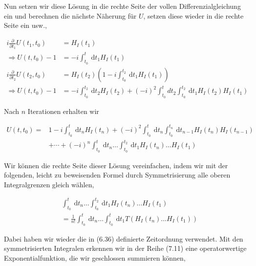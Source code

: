 \documentclass[10pt, letterpaper]{article}
\begin{document}
Nun setzen wir diese Lösung in die rechte Seite der vollen Differenzialgleichung ein und berechnen die nächste Näherung für $U$, setzen diese wieder in die rechte Seite ein usw.,

$$
\begin{aligned}
i \frac{\partial}{\partial t_{1}} U\left(t_{1}, t_{0}\right) & =H_{I}\left(t_{1}\right) \\
\Rightarrow U\left(t, t_{0}\right)-1 & =-i \int_{t_{0}}^{t} \mathrm{~d} t_{1} H_{I}\left(t_{1}\right) \\
i \frac{\partial}{\partial t_{2}} U\left(t_{2}, t_{0}\right) & =H_{I}\left(t_{2}\right)\left(1-i \int_{t_{0}}^{t_{2}} \mathrm{~d} t_{1} H_{I}\left(t_{1}\right)\right) \\
\Rightarrow U\left(t, t_{0}\right)-1 & =-i \int_{t_{0}}^{t_{2}} \mathrm{~d} t_{2} H_{I}\left(t_{2}\right)+(-i)^{2} \int_{t_{0}}^{t} d t_{2} \int_{t_{0}}^{t_{2}} \mathrm{~d} t_{1} H_{I}\left(t_{2}\right) H_{I}\left(t_{1}\right)
\end{aligned}
$$

Nach $n$ Iterationen erhalten wir

$$
\begin{aligned}
U\left(t, t_{0}\right)= & 1-i \int_{t_{0}}^{t} \mathrm{~d} t_{n} H_{I}\left(t_{n}\right)+(-i)^{2} \int_{t_{0}}^{t} \mathrm{~d} t_{n} \int_{t_{0}}^{t_{n}} \mathrm{~d} t_{n-1} H_{I}\left(t_{n}\right) H_{I}\left(t_{n-1}\right) \\
& +\cdots+(-i)^{n} \int_{t_{0}}^{t} \mathrm{~d} t_{n} \ldots \int_{t_{0}}^{t_{2}} \mathrm{~d} t_{1} H_{I}\left(t_{n}\right) \ldots H_{I}\left(t_{1}\right)
\end{aligned}
$$

Wir können die rechte Seite dieser Lösung vereinfachen, indem wir mit der folgenden, leicht zu beweisenden Formel durch Symmetrisierung alle oberen Integralgrenzen gleich wählen,

$$
\begin{aligned}
& \int_{t_{0}}^{t} \mathrm{~d} t_{n} \ldots \int_{t_{0}}^{t_{2}} \mathrm{~d} t_{1} H_{I}\left(t_{n}\right) \ldots H_{I}\left(t_{1}\right) \\
& =\frac{1}{n!} \int_{t_{0}}^{t} \mathrm{~d} t_{n} \ldots \int_{t_{0}}^{t} \mathrm{~d} t_{1} T\left(H_{I}\left(t_{n}\right) \ldots H_{I}\left(t_{1}\right)\right)
\end{aligned}
$$

Dabei haben wir wieder die in (6.36) definierte Zeitordnung verwendet. Mit den symmetrisierten Integralen erkennen wir in der Reihe (7.11) eine operatorwertige Exponentialfunktion, die wir geschlossen summieren können,
\end{document}
